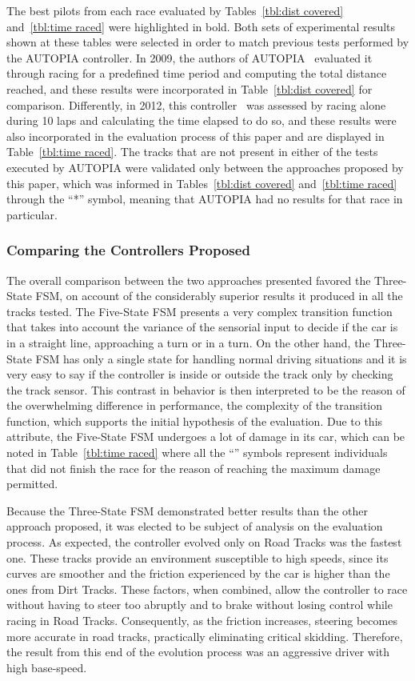 	The best pilots from each race evaluated by Tables~\ref{tbl:dist covered} and~\ref{tbl:time raced} were highlighted in bold. Both sets of experimental results shown at these tables were selected in order to match previous tests performed by the AUTOPIA controller. In 2009, the authors of AUTOPIA~\cite{AUTOPIA2009} evaluated it through racing for a predefined time period and computing the total distance reached, and these results were incorporated in Table~\ref{tbl:dist covered} for comparison. Differently, in 2012, this controller~\cite{AUTOPIA} was assessed by racing alone during 10 laps and calculating the time elapsed to do so, and these results were also incorporated in the evaluation process of this paper and are displayed in Table~\ref{tbl:time raced}. The tracks that are not present in either of the tests executed by AUTOPIA were validated only between the approaches proposed by this paper, which was informed in Tables~\ref{tbl:dist covered} and~\ref{tbl:time raced} through the ``*'' symbol, meaning that AUTOPIA had no results for that race in particular.
	
\subsubsection{Comparing the Controllers Proposed} \label{subsubsec:CompControllers}
	
	The overall comparison between the two approaches presented favored the Three-State FSM, on account of the considerably superior results it produced in all the tracks tested. The Five-State FSM presents a very complex transition function that takes into account the variance of the sensorial input to decide if the car is in a straight line, approaching a turn or in a turn. On the other hand, the Three-State FSM has only a single state for handling normal driving situations and it is very easy to say if the controller is inside or outside the track only by checking the track sensor. This contrast in behavior is then interpreted to be the reason of the overwhelming difference in performance, the complexity of the transition function, which supports the initial hypothesis of the evaluation. Due to this attribute, the Five-State FSM undergoes a lot of damage in its car, which can be noted in Table~\ref{tbl:time raced} where all the ``\textdagger'' symbols represent individuals that did not finish the race for the reason of reaching the maximum damage permitted.
	
	Because the Three-State FSM demonstrated better results than the other approach proposed, it was elected to be subject of analysis on the evaluation process. As expected, the controller evolved only on Road Tracks was the fastest one. These tracks provide an environment susceptible to high speeds, since its curves are smoother and the friction experienced by the car is higher than the ones from Dirt Tracks. These factors, when combined, allow the controller to race without having to steer too abruptly and to brake without losing control while racing in Road Tracks. Consequently, as the friction increases, steering becomes more accurate in road tracks, practically eliminating critical skidding. Therefore, the result from this end of the evolution process was an aggressive driver with high base-speed.
	
